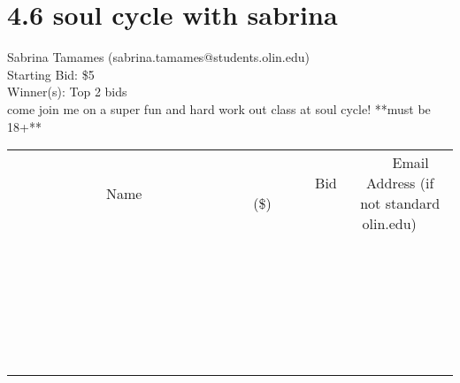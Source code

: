 \documentclass[11pt]{article}
\begin{document}
\section*{4.6 soul cycle with sabrina }
Sabrina Tamames (sabrina.tamames@students.olin.edu) \\
Starting Bid: \$5 \\
Winner(s): 
Top 2 bids \\
come join me on a super fun and hard work out class at soul cycle! **must be 18+** \\[6ex]
\begin{tabular}{c c c}
~~~~~~~~~~~~~Name~~~~~~~~~~~~~ & ~~~~~~~~~Bid (\$)~~~~~~~~~ & ~~~Email Address (if not standard olin.edu)~~~ \\
 & & \\
\hline
 & & \\
\hline
 & & \\
\hline
 & & \\
\hline
 & & \\
\hline
 & & \\
\hline
 & & \\
\hline
 & & \\
\hline
 & & \\
\hline
 & & \\
\hline
 & & \\
\hline
 & & \\
\hline
 & & \\
\hline
 & & \\
\hline
 & & \\
\hline
 & & \\
\hline
 & & \\
\hline
 & & \\
\hline
 & & \\
\hline
 & & \\
\hline
 & & \\
\hline
 & & \\
\hline
 & & \\
\hline
 & & \\
\hline
 & & \\
\hline
 & & \\
\hline
\end{tabular}
\clearpage
\end{document}
